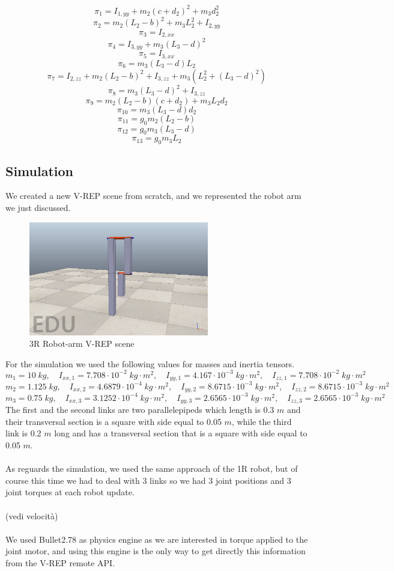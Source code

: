 \documentclass{article}
\begin{document}
\[\pi_1= I_{1,yy} + m_2 (c+ d_2)^2 + m_3 d_2^2\]
\[\pi_2 = m_2(L_2 -b)^2 + m_3 L_2^2 + I_{2,yy}\]
\[\pi_3 = I_{2,xx}\]
\[\pi_4 = I_{3,yy} + m_3(L_3 - d)^2\]
\[\pi_5 = I_{3,xx}\]
\[\pi_6 = m_3(L_3 -d)L_2\]
\[\pi_7 = I_{2,zz} + m_2(L_2 - b)^2 + I_{3,zz} + m_3(L_2^2 + (L_3 - d)^2 )\]
\[\pi_8 = m_3(L_3 -d)^2 + I_{3,zz}\]
\[\pi_9 = m_2(L_2 - b)(c+ d_2) + m_3 L_2 d_2\]
\[\pi_{10} = m_3(L_3 - d)d_2\]
\[\pi_{11} = g_0 m_2 (L_2 - b)\]
\[\pi_{12} = g_0 m_3 (L_3 - d)\]
\[\pi_{13} = g_0 m_3 L_2\]
\subsection{Simulation}
We created a new V-REP scene from scratch, and we represented the robot arm we just discussed.
\FloatBarrier
\begin{figure}[!htbp]
\centering
\includegraphics[width=0.7\textwidth]{images/3-dof/scene.png}
\caption{3R Robot-arm V-REP scene}
\end{figure}
\FloatBarrier
For the simulation we used the following values for masses and inertia tensors.
\[m_1 = 10 \;kg,\quad I_{xx,1} = 7.708\cdot 10^{-2}\;kg\cdot m^2,\quad I_{yy,1} = 4.167 \cdot 10^{-3}\;kg\cdot m^2,\quad I_{zz,1} = 7.708\cdot 10^{-2}\;kg\cdot m^2\]
\[ m_2 = 1.125\;kg,\quad I_{xx,2} = 4.6879\cdot10^{-4}\;kg\cdot m^2,\quad I_{yy,2} = 8.6715\cdot 10^{-3}\;kg\cdot m^2,\quad I_{zz,2} = 8.6715\cdot 10^{-3}\;kg\cdot m^2\]
\[m_3 = 0.75\;kg,\quad I_{xx,3} = 3.1252\cdot 10^{-4}\;kg\cdot m^2,\quad I_{yy,3} = 2.6565\cdot 10^{-3}\;kg\cdot m^2,\quad I_{zz,3} = 2.6565\cdot 10^{-3}\;kg\cdot m^2\]
The first and the second links are two parallelepipeds which length is 0.3 $m$ and their transversal section is a square with side equal to 0.05 $m$, while the third link is 0.2 $m$ long and has a transversal section that is a square with side equal to 0.05 $m$.\\\\
As reguards the simulation, we used the same approach of the 1R robot, but of course this time we had to deal with 3 links so we had 3 joint positions and 3 joint torques at each robot update.\\\\(vedi velocità)\\\\
We used Bullet2.78 as physics engine as we are interested in torque applied to the joint motor, and using this engine is the only way to get directly this information from the V-REP remote API.
\end{document}
